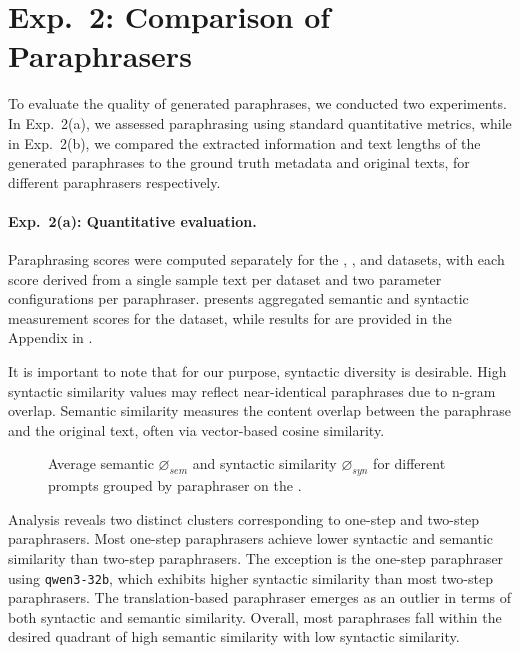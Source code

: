 \section{Exp.\ 2: Comparison of Paraphrasers}
\label{sec:comp_paraphrases}

To evaluate the quality of generated paraphrases, we conducted two experiments. 
In Exp.\ 2(a), we assessed paraphrasing using standard quantitative metrics, while in Exp.\ 2(b), we compared the extracted information and text lengths of the generated paraphrases to the ground truth metadata and original texts, for different paraphrasers respectively.

\paragraph{Exp.\ 2(a): Quantitative evaluation.}

Paraphrasing scores were computed separately for the \dataBlog{}, \dataGutenberg{}, and \dataStudent{} datasets, with each score derived from a single sample text per dataset and two parameter configurations per paraphraser.
 presents aggregated semantic and syntactic measurement scores for the \dataBlog{} dataset, while results for \dataGutenberg{} are provided in the Appendix in .

It is important to note that for our purpose, syntactic diversity is desirable.
High syntactic similarity values may reflect near-identical paraphrases due to n-gram overlap. 
Semantic similarity measures the content overlap between the paraphrase and the original text, often via vector-based cosine similarity. 

\begin{figure}[htbp]
    \centering
    
    \caption[Comparison of paraphrasers on the \dataBlog{} dataset]{Average semantic $\diameter_{sem}$ and syntactic similarity $\diameter_{syn}$ for different prompts grouped by paraphraser on the \dataBlog{}.}
    \label{fig:sem_syn_blog}
\end{figure}

Analysis reveals two distinct clusters corresponding to one-step and two-step paraphrasers. 
Most one-step paraphrasers achieve lower syntactic and semantic similarity than two-step paraphrasers. 
The exception is the one-step paraphraser using \texttt{qwen3-32b}, which exhibits higher syntactic similarity than most two-step paraphrasers. 
The translation-based paraphraser emerges as an outlier in terms of both syntactic and semantic similarity. 
Overall, most paraphrases fall within the desired quadrant of high semantic similarity with low syntactic similarity.

